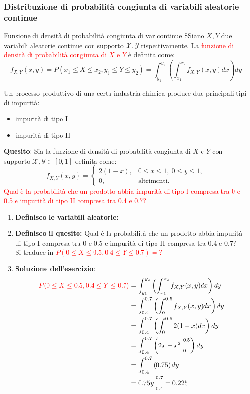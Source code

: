 \documentclass{article}  %
\theoremstyle{definition}
\begin{document}
\subsubsection{Distribuzione di probabilità congiunta di variabili aleatorie continue}
\begin{theorem}{Funzione di densità di probabilità congiunta di var continue}
	SSiano $X,Y$ due variabili aleatorie continue con supporto $\mathscr{X},\mathscr{Y}$ rispettivamente. La \textcolor{red}{funzione di densità di probabilità congiunta di $X$ e $Y$} è definita come:
	\[
		f_{X,Y}(x,y)=P(x_1 \leq X \leq x_2, y_1 \leq Y \leq y_2)=\int_{y_1}^{y_2}\left(\int_{x_1}^{x_2}f_{X,Y}(x,y) dx\right)dy
	\]
\end{theorem}
\begin{esercizio}[Esercizio]
	Un processo produttivo di una certa industria chimica produce due
	principali tipi di impurità:
	\begin{itemize}
		\item impurità di tipo I
		\item impurità di tipo II
	\end{itemize}
	\textbf{Quesito: }
	Sia la funzione di densità di probabilità congiunta di $X$ e $Y$ con supporto $\mathscr{X},\mathscr{Y} \in [0,1]$ definita come:
	\[
		f_{X,Y}(x,y)=
		\begin{cases}
			2(1-x), & 0 \le x \le 1,\; 0 \le y \le 1, \\
			0,      & \text{altrimenti}.
		\end{cases}
	\]
	\textcolor{red}{Qual è la probabilità che un prodotto abbia impurità di tipo I compresa tra 0 e 0.5 e impurità di tipo II compresa tra 0.4 e 0.7?}
	\begin{enumerate}
		\item \textbf{Definisco le variabili aleatorie:}
		\item \textbf{Definisco il quesito:} Qual è la probabilità che un prodotto abbia impurità di tipo I compresa tra 0 e 0.5 e impurità di tipo II compresa tra 0.4 e 0.7? \\
		      Si traduce in \textcolor{red}{$P(0 \leq X \leq 0.5, 0.4 \leq Y \leq 0.7)=?$}
		\item \textbf{Soluzione dell'esercizio:}
		      \begin{align*}
			      \textcolor{red}{P(0 \leq X \leq 0.5, 0.4 \leq Y \leq 0.7)}
			       & = \int_{y_1}^{y_2}\left(\int_{x_1}^{x_2}f_{X,Y}(x,y) dx\right)dy \\
			       & = \int_{0.4}^{0.7}\left(\int_{0}^{0.5}f_{X,Y}(x,y) dx\right)dy   \\
			       & = \int_{0.4}^{0.7}\left(\int_{0}^{0.5}2(1-x) dx\right)dy         \\
			       & = \int_{0.4}^{0.7}\left(2x-x^2\Big|_{0}^{0.5}\right)dy           \\
			       & = \int_{0.4}^{0.7}\left(0.75\right)dy                            \\
			       & = 0.75y\Big|_{0.4}^{0.7} = 0.225
		      \end{align*}
	\end{enumerate}
\end{esercizio}
\end{document}
